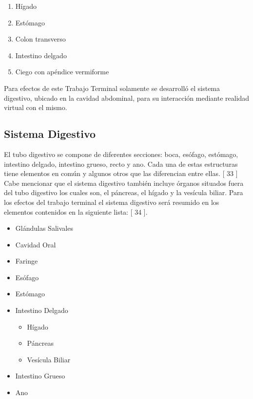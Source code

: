 \begin{enumerate}
  \item Hígado
  \item Estómago
  \item Colon transverso
  \item Intestino delgado
  \item Ciego con apéndice vermiforme
\end{enumerate}
Para efectos de este Trabajo Terminal solamente se desarrolló el sistema digestivo, ubicado en la cavidad abdominal, para su interacción mediante realidad virtual con el mismo.\\

\subsection{Sistema Digestivo}
El tubo digestivo se compone de diferentes secciones: boca, esófago, estómago, intestino delgado, intestino grueso, recto y ano. Cada una de estas estructuras tiene elementos en común y algunos otros que las diferencian entre ellas.  [ 33 ] Cabe mencionar que el sistema digestivo también incluye órganos situados fuera del tubo digestivo los cuales son, el páncreas, el hígado y la vesícula biliar. Para los efectos del trabajo terminal el sistema digestivo será resumido en los elementos contenidos en la siguiente lista: 
[ 34 ].\\
\begin{itemize}
  \item Glándulas Salivales
  \item Cavidad Oral
  \item Faringe
  \item Esófago
  \item Estómago
  \item Intestino Delgado
  \begin{itemize}
    \item Hígado
    \item Páncreas
    \item Vesícula Biliar
  \end{itemize}
  \item Intestino Grueso
  \item Ano  
\end{itemize}

